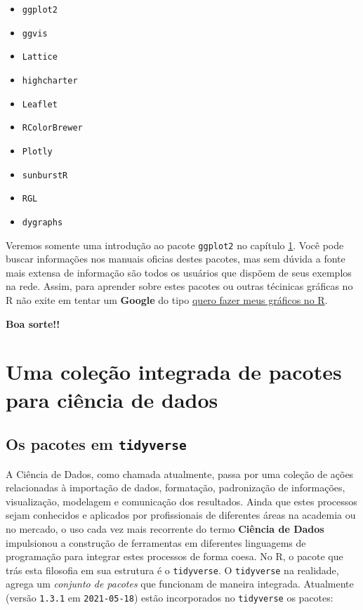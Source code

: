 \documentclass[
]{book}
\providecommand{\tightlist}{%
  \setlength{\itemsep}{0pt}\setlength{\parskip}{0pt}}
\begin{document}
\begin{itemize}
\tightlist
\item
  \texttt{ggplot2}
\item
  \texttt{ggvis}
\item
  \texttt{Lattice}
\item
  \texttt{highcharter}
\item
  \texttt{Leaflet}
\item
  \texttt{RColorBrewer}
\item
  \texttt{Plotly}
\item
  \texttt{sunburstR}
\item
  \texttt{RGL}
\item
  \texttt{dygraphs}
\end{itemize}

Veremos somente uma introdução ao pacote \texttt{ggplot2} no capítulo \ref{tidy}. Você pode buscar informações nos manuais oficias destes pacotes, mas sem dúvida a fonte mais extensa de informação são todos os usuários que dispõem de seus exemplos na rede. Assim, para aprender sobre estes pacotes ou outras técinicas gráficas no R não exite em tentar um \textbf{Google} do tipo \href{https://www.google.com.br/search?sxsrf=ALeKk00KUMfabSYS-mRTqdTiLdeOR65jnA\%3A1594162286064\&source=hp\&ei=bvwEX8TUAZm25OUP0LCXsAw\&q=quero+fazer+meus+gr\%C3\%A1ficos+no+R\&oq=quero+fazer+meus+gr\%C3\%A1ficos+no+R\&gs_lcp=CgZwc3ktYWIQA1DwDVjwDWCRF2gAcAB4AIABmgGIAZoBkgEDMC4xmAEAoAECoAEBqgEHZ3dzLXdpeg\&sclient=psy-ab\&ved=0ahUKEwjEw5emnbzqAhUZG7kGHVDYBcYQ4dUDCAc\&uact=5}{quero fazer meus gráficos no R}.

\textbf{Boa sorte!!}

\hypertarget{part-uma-coleuxe7uxe3o-integrada-de-pacotes-para-ciuxeancia-de-dados}{%
\part{Uma coleção integrada de pacotes para ciência de dados}\label{part-uma-coleuxe7uxe3o-integrada-de-pacotes-para-ciuxeancia-de-dados}}

\hypertarget{tidy}{%
\chapter{\texorpdfstring{Os pacotes em \texttt{tidyverse}}{Os pacotes em tidyverse}}\label{tidy}}

A Ciência de Dados, como chamada atualmente, passa por uma coleção de ações relacionadas à importação de dados, formatação, padronização de informações, visualização, modelagem e comunicação dos resultados. Ainda que estes processos sejam conhecidos e aplicados por profissionais de diferentes áreas na academia ou no mercado, o uso cada vez mais recorrente do termo \textbf{Ciência de Dados} impulsionou a construção de ferramentas em diferentes linguagems de programação para integrar estes processos de forma coesa. No R, o pacote que trás esta filosofia em sua estrutura é o \texttt{tidyverse}. O \texttt{tidyverse} na realidade, agrega um \emph{conjunto de pacotes} que funcionam de maneira integrada. Atualmente (versão \texttt{1.3.1} em \texttt{2021-05-18}) estão incorporados no \texttt{tidyverse} os pacotes:
\end{document}

